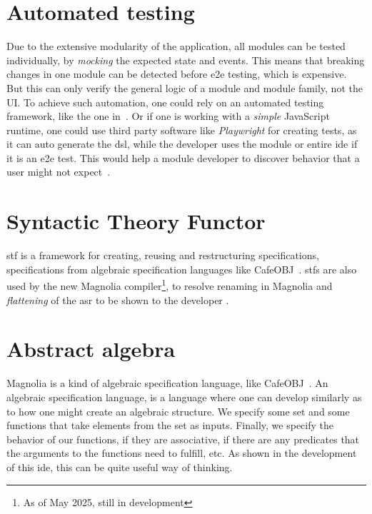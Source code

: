 \section{Automated testing}

Due to the extensive modularity of the application, all modules can be tested
individually, by \textit{mocking} the expected state and events. This means that
breaking changes in one module can be detected before \gls*{e2e} testing, which
is expensive. But this can only verify the general logic of a module and module
family, not the UI. To achieve such automation, one could rely on an automated
testing framework, like the one in~\cite{autoUi}. Or if one is working with a
\textit{simple} JavaScript runtime, one could use third party software like
\textit{Playwright} for creating tests, as it can auto generate the \gls*{dsl},
while the developer uses the module or entire \gls*{ide} if it is an \gls*{e2e}
test. This would help a module developer to discover behavior that a user might
not expect~\cite{leastGui}.


\section{Syntactic Theory Functor}

\gls*{stf} is a framework for creating, reusing and restructuring
specifications\cite{stf:haveraaen:2020}, specifications from algebraic
specification languages like CafeOBJ~\cite{cafeObj}. \gls*{stf}s are also used
by the new Magnolia compiler\footnote{As of May 2025, still in development}, to
resolve renaming in Magnolia and \textit{flattening} of the \gls*{asr} to be
shown to the developer \cite{wiig}.


\section{Abstract algebra}

Magnolia is a kind of algebraic specification language, like CafeOBJ~\cite{cafeObj}.
An algebraic specification language, is a language where one can develop
similarly as to how one might create an algebraic structure. We specify some set
and some functions that take elements from the set as inputs. Finally, we
specify the behavior of our functions, if they are associative, if there are any
predicates that the arguments to the functions need to fulfill, etc. As shown in
the development of this \gls*{ide}, this can be quite useful way of thinking.


